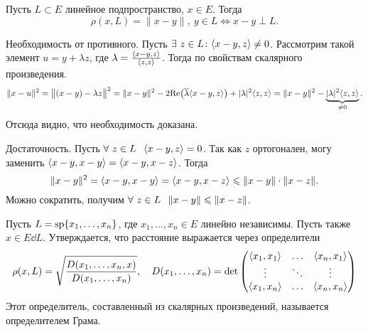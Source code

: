 \begin{Lem}\label{BestApproximationLemma}
  Пусть $L\subset E$ линейное подпространство, $x\in E$. Тогда
\[
  \rho(x,L) = \|x-y\|,\ y\in L\iff x-y\perp L.
\]
\end{Lem}
\begin{Proof}
  Необходимость от противного. Пусть $\exists\ z\in L\colon \langle x-y,z\rangle \ne0$. Рассмотрим такой элемент $u = y+\lambda z$, где $\lambda = \frac{\langle x-y,z\rangle }{\langle z,z\rangle }$. Тогда по свойствам скалярного произведения.
\[
  \|x-u\|^2 = \big\|(x-y)-\lambda z\big\|^2 = \|x-y\|^2 - 2\mathrm{\mathop{Re}}\big(\overline{\lambda}\langle x-y,z\rangle \big)+|\lambda|^2\langle z,z\rangle  =
  \|x-y\|^2-\underbrace{|\lambda|^2\langle z,z\rangle }_{\ne0}.
\]
Отсюда видно, что необходимость доказана.

Достаточность. Пусть $\forall\ z\in L\pau \la x-y,z\ra  = 0$.
Так как $z$ ортогонален, могу заменить $\langle x-y,x-y\rangle  = \langle x-y,x-z\rangle $. Тогда
\[
  \|x-y\|^2 = \langle x-y,x-y\rangle  = \langle x-y,x-z\rangle \leqslant \|x-y\|\cdot \|x-z\|.
\]
Можно сократить, получим $\forall\ z\in L\pau \|x-y\|\le \|x-z\|$.
\end{Proof}

\begin{The}
  Пусть $L = \operatorname{sp}\{x_1,\dots,x_n\}$, где $x_1,\dots,x_n\in E$ линейно независимы. Пусть также $x\in E\dd L$. Утверждается, что расстояние выражается через определители
\[
  \rho(x,L) = \sqrt{\frac{D(x_1,\dots,x_n,x)}{D(x_1,\dots,x_n)}},\quad
  D(x_1,\dots,x_n) = \det\begin{pmatrix}
   \langle x_1,x_1\rangle &\dots & \langle x_n,x_1\rangle\\
   \vdots & \ddots & \vdots\\
   \langle x_1,x_n\rangle &\dots & \langle x_n,x_n\rangle
\end{pmatrix}
\]
Этот определитель, составленный из скалярных произведений, называется определителем Грама.
\end{The}

